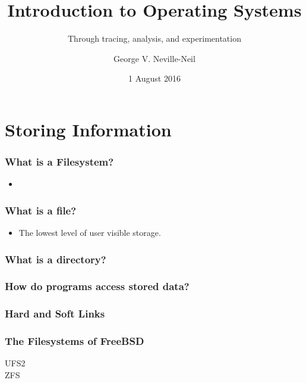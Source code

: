 \documentclass[pdftex]{beamer} %
\begin{document}

\title{Introduction to Operating Systems}
\subtitle{Through tracing, analysis, and experimentation}
\author{George V. Neville-Neil}
\date{1 August 2016}

\begin{frame}
  \titlepage
\end{frame}

\section{Storing Information}
\label{sec:storage}

\begin{frame}
  \frametitle{What is a Filesystem?}
  \begin{itemize}
  \item 
  \end{itemize}
\end{frame}

\begin{frame}
  \frametitle{What is a file?}
  \begin{itemize}
  \item The lowest level of user visible storage.
  \end{itemize}
\end{frame}

\begin{frame}
  \frametitle{What is a directory?}
  
\end{frame}

\begin{frame}
  \frametitle{How do programs access stored data?}
  
\end{frame}

\begin{frame}
  \frametitle{Hard and Soft Links}
  
\end{frame}

\begin{frame}
  \frametitle{The Filesystems of FreeBSD}
  \begin{description}
  \item [UFS2] 
  \item [ZFS]
  \end{description}
\end{frame}
\end{document}
